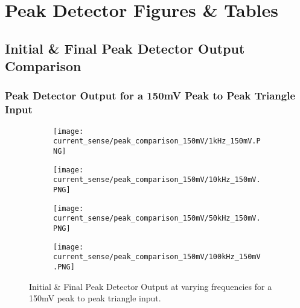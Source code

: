 \chapter{Peak Detector Figures \& Tables}\label{A:peak_detector}

\section{Initial \& Final Peak Detector Output Comparison}\label{A:peak_detector_screenshots}

\subsection{Peak Detector Output for a 150mV Peak to Peak Triangle Input}
\begin{figure}[H]
    
    \centering
    \begin{subfigure}{0.45\textwidth}
        \texttt{[image: current\_sense/peak\_comparison\_150mV/1kHz\_150mV.PNG]}
    \end{subfigure}
    \begin{subfigure}{0.45\textwidth}
        \texttt{[image: current\_sense/peak\_comparison\_150mV/10kHz\_150mV.PNG]}
    \end{subfigure}
    \begin{subfigure}{0.45\textwidth}
        \texttt{[image: current\_sense/peak\_comparison\_150mV/50kHz\_150mV.PNG]}
    \end{subfigure}
    \begin{subfigure}{0.45\textwidth}
        \texttt{[image: current\_sense/peak\_comparison\_150mV/100kHz\_150mV.PNG]}
    \end{subfigure}
    \caption{Initial \& Final Peak Detector Output at varying frequencies for a 150mV peak to peak triangle input.}
\end{figure}

